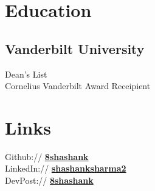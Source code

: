 \documentclass[letterpaper]{deedy-resume} %
\begin{document}

\lastupdated %



\begin{minipage}[t]{0.33\textwidth} %


\section{Education} 

\subsection{Vanderbilt University}

Dean's List \\
Cornelius Vanderbilt Award Receipient \\
\sectionspace %


\section{Links} 

Github:// \href{https://github.com/8shashank}{\bf 8shashank} \\
LinkedIn:// \href{https://www.linkedin.com/in/shashanksharma2}{\bf shashanksharma2} \\
DevPost:// \href{http://devpost.com/8shashank}{\bf 8shashank}


\end{minipage}
\end{document}
